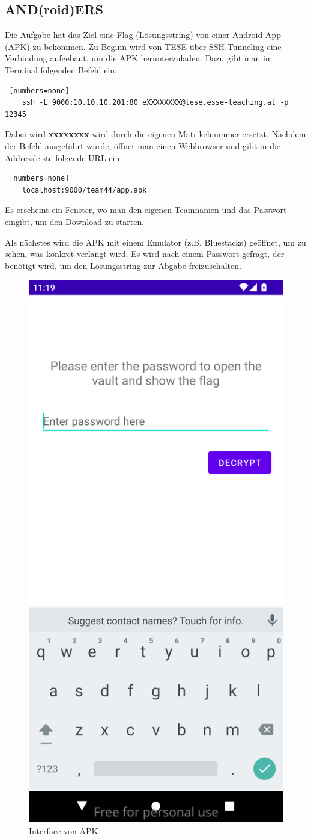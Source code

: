 \documentclass[12pt, a4paper, titlepage, oneside]{scrartcl}
\begin{document}
	\subsection{AND(roid)ERS}
	Die Aufgabe hat das Ziel eine Flag (Lösungsstring) von einer Android-App (APK) zu bekommen. Zu Beginn wird von TESE über SSH-Tunneling eine Verbindung aufgebaut, um die APK herunterzuladen. Dazu gibt man im Terminal folgenden Befehl ein: 
    \begin{lstlisting} [numbers=none]
    ssh -L 9000:10.10.10.201:80 eXXXXXXXX@tese.esse-teaching.at -p 12345
        \end{lstlisting}
    Dabei wird \textbf{xxxxxxxx} wird durch die eigenen Matrikelnummer ersetzt. Nachdem der Befehl ausgeführt wurde, öffnet man einen Webbrowser und gibt in die Addressleiste folgende URL ein: 
    \begin{lstlisting} [numbers=none]
    localhost:9000/team44/app.apk
    \end{lstlisting}
    Es erscheint ein Fenster, wo man den eigenen Teamnamen und das Passwort eingibt, um den Download zu starten. \newline
    
    \noindent Als nächstes wird die APK mit einem Emulator (z.B. Bluestacks) geöffnet, um zu sehen, was konkret verlangt wird. Es wird nach einem Passwort gefragt, der benötigt wird, um den Lösungsstring zur Abgabe freizuschalten. \newline
    
    \begin{figure}
        \centering
        \includegraphics[width=0.25\linewidth]{imgs//AND(roid)ERS/Screenshot from 2025-01-12 12-19-30.png}
        \caption{Interface von APK}
        \label{fig:enter-label}
    \end{figure}
    
\end{document}
